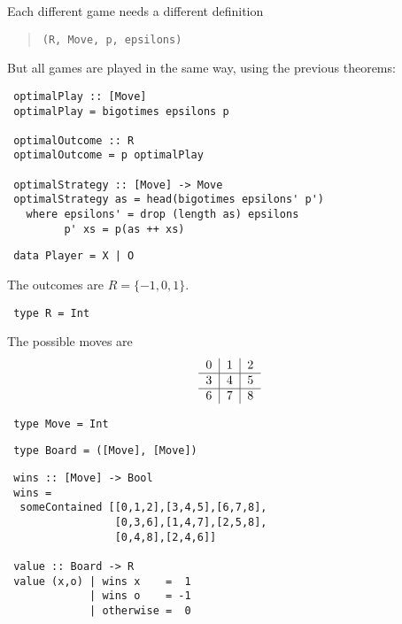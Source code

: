 \documentclass%
[%
Screen4to3,
]{foils}
\begin{document}

Each different game needs a different definition
\begin{quote}
  \verb+(R, Move, p, epsilons)+
\end{quote}


But all games are played in the same way, using the previous theorems:
\begin{verbatim}
 optimalPlay :: [Move]
 optimalPlay = bigotimes epsilons p

 optimalOutcome :: R
 optimalOutcome = p optimalPlay

 optimalStrategy :: [Move] -> Move
 optimalStrategy as = head(bigotimes epsilons' p')
   where epsilons' = drop (length as) epsilons
         p' xs = p(as ++ xs)
\end{verbatim}


\newcommand{\play}[9]{\text{%
\begin{tabular}{c|c|c}
$#1$ & $#2$ & $#3$ \\ \hline
$#4$ & $#5$ & $#6$ \\ \hline
$#7$ & $#8$ & $#9$
\end{tabular}%
}%
}

\begin{verbatim}
 data Player = X | O
\end{verbatim}
The outcomes are $R = \{-1, 0, 1\}$.
\begin{verbatim}
 type R = Int
\end{verbatim}
The possible moves are
\[
\play{0}{1}{2}{3}{4}{5}{6}{7}{8}
\]
\begin{verbatim}
 type Move = Int 
\end{verbatim}
\begin{verbatim}
 type Board = ([Move], [Move])
\end{verbatim}

\begin{verbatim}
 wins :: [Move] -> Bool
 wins = 
  someContained [[0,1,2],[3,4,5],[6,7,8],
                 [0,3,6],[1,4,7],[2,5,8],
                 [0,4,8],[2,4,6]]

 value :: Board -> R
 value (x,o) | wins x    =  1 
             | wins o    = -1 
             | otherwise =  0
\end{verbatim}

\end{document}
